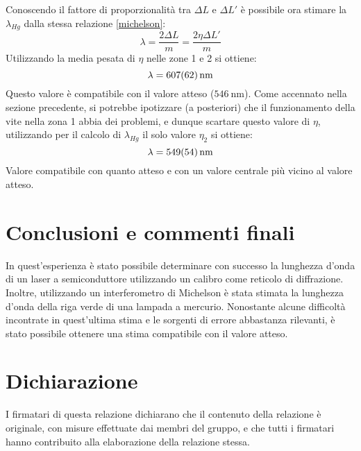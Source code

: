 \documentclass[10pt, a4paper, italian]{article}
\begin{document}
Conoscendo il fattore di proporzionalità tra $\Delta L$ e $ \Delta L'$ è possibile ora stimare la $\lambda_{Hg}$ dalla stessa relazione \eqref{michelson}:
\[
{\lambda=\frac{2 \Delta L}{m}=\frac{2\eta \Delta L'}{m}}
\]
Utilizzando la media pesata di $\eta$ nelle zone 1 e 2 si ottiene:
\[
{\lambda=\SI{607\pm62}{\nano \meter}}
\]
Questo valore è compatibile con il valore atteso ($\SI{546}{\nano \meter}$).\newline
Come accennato nella sezione precedente, si potrebbe ipotizzare (a posteriori) che il funzionamento della vite nella zona 1 abbia dei problemi, e dunque scartare questo valore di $\eta$, utilizzando per il calcolo di $\lambda_{Hg}$ il solo valore $\eta_2$ si ottiene:
\[
{\lambda=\SI{549\pm54}{\nano \meter}}
\]
Valore compatibile con quanto atteso e con un valore centrale più vicino al valore atteso.

\section*{Conclusioni e commenti finali}
In quest'esperienza è stato possibile determinare con successo la lunghezza d'onda di un laser a semiconduttore utilizzando un calibro come reticolo di diffrazione. Inoltre, utilizzando un interferometro di Michelson è stata stimata la lunghezza d'onda della riga verde di una lampada a mercurio. Nonostante alcune difficoltà incontrate in quest'ultima stima e le sorgenti di errore abbastanza rilevanti, è stato possibile ottenere una stima compatibile con il valore atteso.

\section*{Dichiarazione}
I firmatari di questa relazione dichiarano che il contenuto della relazione \`e
originale, con misure effettuate dai membri del gruppo, e che tutti i firmatari
hanno contribuito alla elaborazione della relazione stessa.
\end{document}
